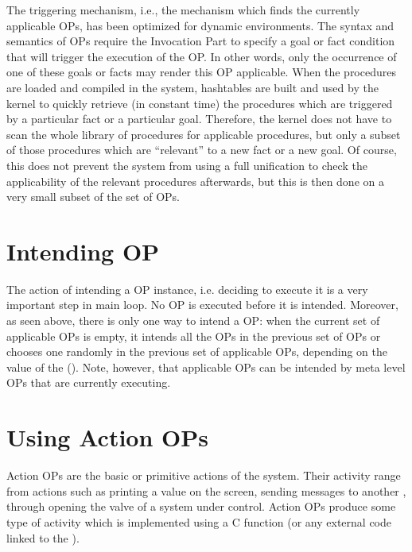 The triggering mechanism, i.e., the mechanism which finds the currently
applicable OPs, has been optimized for dynamic environments. The syntax and semantics 
of OPs require the Invocation Part to specify a goal or fact condition that will trigger the 
execution of the OP. In other words, only the occurrence of one of
these goals or facts may render this OP applicable. When the procedures are
loaded and compiled in the system, hashtables are built and
used by the kernel to quickly retrieve (in constant time) the
procedures which are triggered by a particular fact or a particular goal.
Therefore, the kernel does not have to scan the whole library of procedures
for applicable procedures, but only a subset of those procedures which are
``relevant'' to a new fact or a new goal. Of course, this does not prevent
the system from using a full unification to check the applicability of the
relevant procedures afterwards, but this is then done on a very small
subset of the set of OPs.

\section{Intending OP}

The action of intending a OP instance, i.e. deciding to execute it is a very
important step in \CXPK{} main loop. No OP is executed before it is intended.
Moreover, as seen above, there is only one way to intend a OP: when
the current set of applicable OPs is empty, it intends all the OPs in the
previous set of OPs or chooses one randomly in the previous set of applicable OPs,
depending on the value of the  ().  Note, however, that applicable OPs can be intended by 
meta level OPs that are currently executing.

\section{Using Action OPs}

Action OPs are the basic or primitive actions of the
system. Their activity range from actions such as printing a value on the
screen, sending messages to another \COPRS{}, through opening the valve of a
system under \COPRS{} control. Action OPs produce some type of
activity which is implemented using a C function (or any external code
linked to
the \CPK{}).

